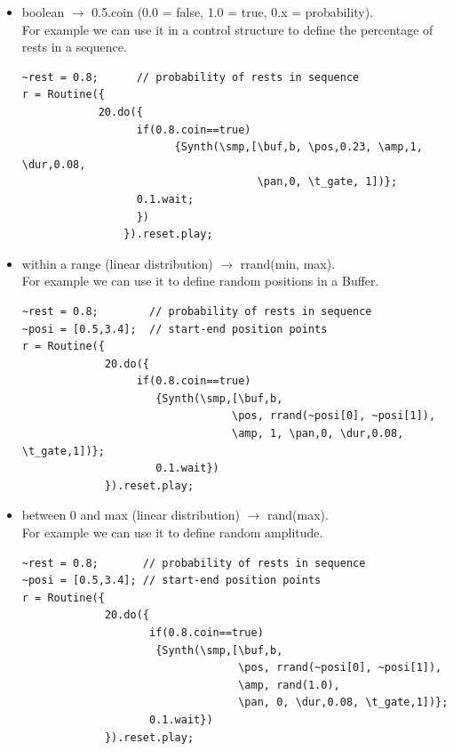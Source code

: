 \begin{itemize}
\tightlist
\item boolean \(\rightarrow\) 0.5.coin (0.0 = false, 1.0 = true, 0.x = probability). \\
For example we can use it in a control structure to define the percentage of rests in a sequence.
\pagebreak
\begin{lstlisting}[frame=single, caption=coin(0.5)] 
~rest = 0.8;      // probability of rests in sequence
r = Routine({
            20.do({
                  if(0.8.coin==true) 
                        {Synth(\smp,[\buf,b, \pos,0.23, \amp,1, \dur,0.08,
                                     \pan,0, \t_gate, 1])};
                  0.1.wait;
                  })
                }).reset.play;
\end{lstlisting}

\item within a range (linear distribution) \(\rightarrow\) rrand(min, max). \\
For example we can use it to define random positions in a Buffer.

\begin{lstlisting}[frame=single, caption=rrand(min\,max)] 
~rest = 0.8;        // probability of rests in sequence
~posi = [0.5,3.4];  // start-end position points
r = Routine({
             20.do({
                  if(0.8.coin==true) 
                     {Synth(\smp,[\buf,b, 
                                 \pos, rrand(~posi[0], ~posi[1]), 
                                 \amp, 1, \pan,0, \dur,0.08, \t_gate,1])};
                     0.1.wait})
             }).reset.play;
\end{lstlisting}

\item between 0 and max (linear distribution) \(\rightarrow\) rand(max). \\
For example we can use it to define random amplitude.

\begin{lstlisting}[frame=single, caption=rand(max)] 
~rest = 0.8;       // probability of rests in sequence
~posi = [0.5,3.4]; // start-end position points
r = Routine({
             20.do({
                    if(0.8.coin==true) 
                     {Synth(\smp,[\buf,b, 
                                  \pos, rrand(~posi[0], ~posi[1]),
                                  \amp, rand(1.0),
                                  \pan, 0, \dur,0.08, \t_gate,1])};
                    0.1.wait})
             }).reset.play;
\end{lstlisting}


\end{itemize}
